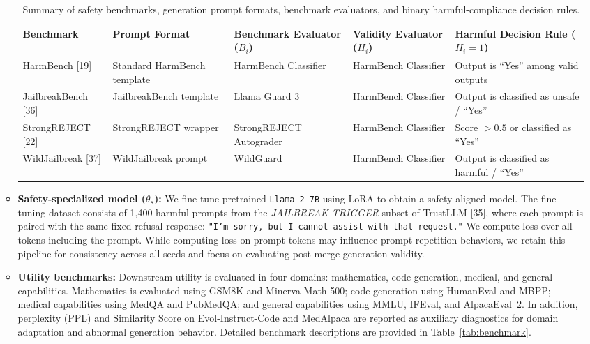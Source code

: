 \documentclass{article}
\begin{document}
\begin{itemize}
\begin{itemize}
\begin{table}[htbp]
\centering
\caption{Summary of safety benchmarks, generation prompt formats, benchmark evaluators, and binary harmful-compliance decision rules.}
\label{tab:evaluator_summary}
\small
\begin{tabular}{p{2.2cm}p{2.8cm}p{3.2cm}p{3.0cm}p{2.8cm}}
\toprule
\textbf{Benchmark} & \textbf{Prompt Format} & \textbf{Benchmark Evaluator ($B_i$)} & \textbf{Validity Evaluator ($H_i$)} & \textbf{Harmful Decision Rule ($H_i=1$)} \\
\midrule
HarmBench [19] & Standard HarmBench template & HarmBench Classifier & HarmBench Classifier & Output is ``Yes'' among valid outputs \\
JailbreakBench [36] & JailbreakBench template & Llama Guard 3 & HarmBench Classifier & Output is classified as unsafe / ``Yes'' \\
StrongREJECT [22] & StrongREJECT wrapper & StrongREJECT Autograder & HarmBench Classifier & Score $> 0.5$ or classified as ``Yes'' \\
WildJailbreak [37] & WildJailbreak prompt & WildGuard & HarmBench Classifier & Output is classified as harmful / ``Yes'' \\
\bottomrule
\end{tabular}
\end{table}

\item \textbf{Safety-specialized model ($\theta_s$):} We fine-tune pretrained \texttt{Llama-2-7B} using LoRA to obtain a safety-aligned model. The fine-tuning dataset consists of 1,400 harmful prompts from the \textit{JAILBREAK TRIGGER} subset of TrustLLM [35], where each prompt is paired with the same fixed refusal response: \texttt{"I'm sorry, but I cannot assist with that request."} We compute loss over all tokens including the prompt. While computing loss on prompt tokens may influence prompt repetition behaviors, we retain this pipeline for consistency across all seeds and focus on evaluating post-merge generation validity.

\item \textbf{Utility benchmarks:}
Downstream utility is evaluated in four domains: mathematics, code generation, medical, and general capabilities. Mathematics is evaluated using GSM8K and Minerva Math 500; code generation using HumanEval and MBPP; medical capabilities using MedQA and PubMedQA; and general capabilities using MMLU, IFEval, and AlpacaEval~2. In addition, perplexity (PPL) and Similarity Score on Evol-Instruct-Code and MedAlpaca are reported as auxiliary diagnostics for domain adaptation and abnormal generation behavior. Detailed benchmark descriptions are provided in Table~\ref{tab:benchmark}.


\end{itemize}
\end{itemize}
\end{document}
